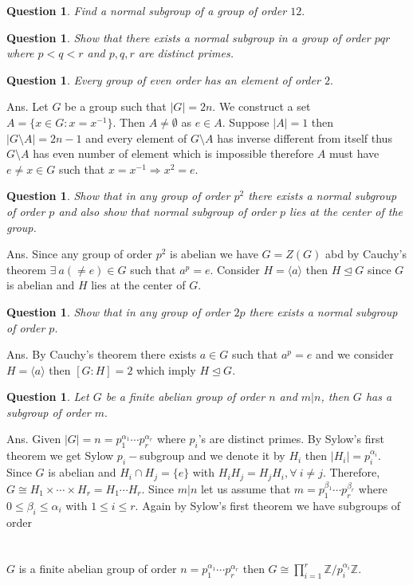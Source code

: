 \documentclass[11pt]{amsart}
\newtheorem{qns}[theorem]{Question}
\newcommand{\ZZ}{\mathbb Z}
\newcommand{\gen}[1]{\langle#1\rangle}
\begin{document}
\begin{qns}
Find a normal subgroup of a group of order $12.$
\end{qns}
\begin{qns}
Show that there exists a normal subgroup in a group of order $pqr$ where $p<q<r$ and $p,q,r$ are distinct primes.
\end{qns}

\begin{qns}
Every group of even order has an element of order $2.$
\end{qns}
Ans. Let $G$ be a group such that $|G|=2n$. We construct a set $A=\{x\in G:x=x^{-1}\}$. Then $A\neq \emptyset$ as $e\in A.$ Suppose $|A|=1$ then $|G\setminus A|=2n-1$ and every element of $G\setminus A$ has inverse different from itself thus $G\setminus A$ has even number of element which is impossible therefore $A$ must have $e\neq x\in G$ such that $x=x^{-1} \Rightarrow x^2=e.$ 
\begin{qns}
Show that in any group of order $p^2$ there exists a normal subgroup of order $p$ and also show that normal subgroup of order $p$ lies at the center of the group.
\end{qns}
Ans. Since any group of order $p^2$ is abelian we have $G=Z(G)$ abd by Cauchy's theorem $\exists~a(\neq e)\in G$ such that $a^p=e$. Consider $H=\gen{a}$ then $H\unlhd G$ since $G$ is abelian and $H$ lies at the center of $G.$ 
\begin{qns}
Show that in any group of order $2p$ there exists a normal subgroup of order $p.$
\end{qns}
Ans. By Cauchy's theorem there exists $a\in G$ such that $a^p=e$ and we consider $H=\gen{a}$ then $[G:H]=2$ which imply $H\unlhd G.$
\begin{qns}
Let $G$ be a finite abelian group of order $n$ and $m|n$, then $G$ has a subgroup of order $m.$
\end{qns}
Ans. Given $|G|=n=p_1^{\alpha_1}\cdots p_r^{\alpha_r}$ where $p_i$'s are distinct primes. By Sylow's first theorem we get Sylow $p_i-$subgroup and we denote it by $H_i$ then $|H_i|=p_i^{\alpha_i}.$ Since $G$ is abelian and $H_i\cap H_j=\{e\}$ with $H_iH_j=H_jH_i,\forall~i\neq j$. Therefore, $G\cong H_1\times \cdots\times H_r=H_1\cdots H_r.$ Since $m|n$ let us assume that $m=p_1^{\beta_1}\cdots p_r^{\beta_r}$ where $0\leq \beta_i\leq \alpha_i$ with $1\leq i\leq r.$ Again by Sylow's first theorem we have subgroups of order \\
\\
\\
$G$ is a finite abelian group of order $n=p_1^{\alpha_1}\cdots p_r^{\alpha_r}$ then $G\cong \displaystyle\prod_{i=1}^r {\ZZ}/p_i^{\alpha_i}{\ZZ}.$
\end{document}

